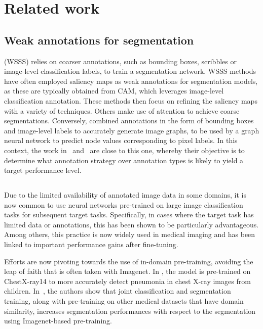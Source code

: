 \section{Related work}
\label{sec:related}

\subsection{Weak annotations for segmentation}
 (WSSS) relies on coarser annotations, such as bounding boxes, scribbles or image-level classification labels, to train a segmentation network. WSSS methods have often employed saliency maps as weak annotations for segmentation models, as these are typically obtained from CAM, which leverages image-level classification annotation. These methods then focus on refining the saliency maps with a variety of techniques. Others make use of attention to achieve coarse segmentations. Conversely,  combined annotations in the form of bounding boxes and image-level labels to accurately generate image graphs, to be used by a graph neural network to predict node values corresponding to pixel labels. In this context, the work in~ and~ are close to this one, whereby their objective is to determine what annotation strategy over annotation types is likely to yield a target performance level. 

\subsection{}
Due to the limited availability of annotated image data in some domains, it is now common to use neural networks pre-trained on large image classification tasks for subsequent target tasks. Specifically, in cases where the target task has limited data or annotations, this has been shown to be particularly advantageous. Among others, this practice is now widely used in medical imaging and has been linked to important performance gains after fine-tuning.

Efforts are now pivoting towards the use of in-domain pre-training, avoiding the leap of faith that is often taken with Imagenet. In , the model is pre-trained on ChestX-ray14 to more accurately detect pneumonia in chest X-ray images from children. In~, the authors show that joint classification and segmentation training, along with pre-training on other medical datasets that have domain similarity, increases segmentation performances with respect to the segmentation using Imagenet-based pre-training.

